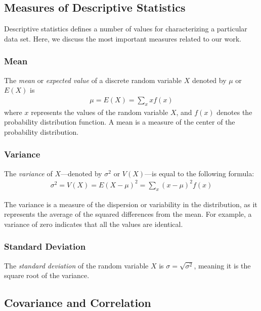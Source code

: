 
\subsection{Measures of Descriptive Statistics}

Descriptive statistics defines a number of values for characterizing a particular data set. Here, we discuss the most important measures related to our work.

\subsubsection{Mean}
The \textit{mean} or \textit{expected value} of a discrete random variable $X$ denoted by $\mu$ or $E(X)$ is
\begin{align}
	\mu = E(X) = \sum_{x} xf(x)
\end{align}
where $x$ represents the values of the random variable $X$, and $f(x)$ denotes the probability distribution function. A mean is a measure of the center of the probability distribution.

\subsubsection{Variance}

The \textit{variance} of $X$---denoted by $\sigma^2$ or $V(X)$---is equal to the following formula:
\begin{align}
	\sigma^2 = V(X) = E(X - \mu)^2 = \sum_{x}(x - \mu)^2 f(x)
\end{align}

The variance is a measure of the dispersion or variability in the distribution, as it represents the average of the squared differences from the mean. For example, a variance of zero indicates that all the values are identical.

\subsubsection{Standard Deviation}

The \textit{standard deviation} of the random variable $X$ is $\sigma = \sqrt{\sigma^2}$, meaning it is the square root of the variance.

\subsection{Covariance and Correlation}

